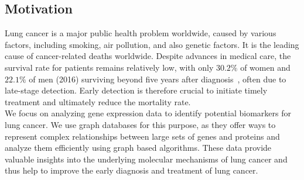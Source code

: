 \subsection{Motivation} \label{subsec:motivation}

Lung cancer is a major public health problem worldwide, caused by various factors,
including smoking, air pollution, and also genetic factors.
It is the leading cause of cancer-related deaths worldwide\cite{ferlay2024global}.
Despite advances in medical care, the survival rate for patients remains relatively low,
with only $30.2\%$ of women and $22.1\%$ of men (2016)
surviving beyond five years after diagnosis~\cite{seer2024explorer}, often due to late-stage detection.
Early detection is therefore crucial to initiate timely treatment and ultimately reduce the mortality rate.
\\

We focus on analyzing gene expression data to identify potential biomarkers for lung cancer.
We use graph databases for this purpose,
as they offer ways to represent complex relationships between large sets of genes and proteins
and analyze them efficiently using graph based algorithms.
These data provide valuable insights into the underlying molecular mechanisms of lung cancer
and thus help to improve the early diagnosis and treatment of lung cancer.